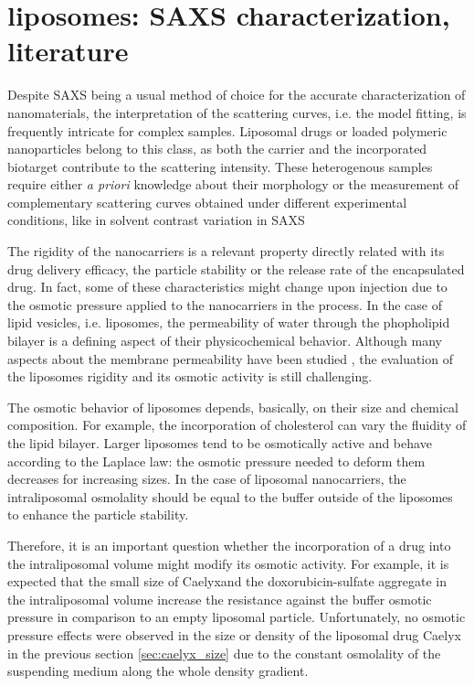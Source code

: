 \section{liposomes: SAXS characterization, literature}

Despite SAXS being a usual method of choice for the accurate characterization of nanomaterials, the interpretation of the scattering curves, i.e. the model fitting, is frequently intricate for complex samples. Liposomal drugs or loaded polymeric nanoparticles belong to this class, as both the carrier and the incorporated biotarget contribute to the scattering intensity. These heterogenous samples require either \emph{a priori} knowledge about their morphology or the measurement of complementary scattering curves obtained under different experimental conditions, like in solvent contrast variation in SAXS


The rigidity of the nanocarriers is a relevant property directly related with its drug delivery efficacy, the particle stability or the release rate of the encapsulated drug. In fact, some of these characteristics might change upon injection due to the osmotic pressure applied to the nanocarriers in the process. In the case of lipid vesicles, i.e. liposomes, the permeability of water through the phopholipid bilayer is a defining aspect of their physicochemical behavior. Although many aspects about the membrane permeability have been studied \citep{nagle_theory_2008, mathai_structural_2008, olbrich_water_2000}, the evaluation of the liposomes rigidity and its osmotic activity is still challenging.

The osmotic behavior of liposomes depends, basically, on their size and chemical composition. For example, the incorporation of cholesterol can vary the fluidity of the lipid bilayer. Larger liposomes tend to be osmotically active \citep{de_gier_osmotic_1993} and behave according to the Laplace law: the osmotic pressure needed to deform them decreases for increasing sizes. In the case of liposomal nanocarriers, the intraliposomal osmolality should be equal to the buffer outside of the liposomes to enhance the particle stability. 

Therefore, it is an important question whether the incorporation of a drug into the intraliposomal volume might modify its osmotic activity. For example, it is expected that the small size of Caelyx\textregistered and the doxorubicin-sulfate aggregate in the intraliposomal volume increase the resistance against the buffer osmotic pressure in comparison to an empty liposomal particle. Unfortunately, no osmotic pressure effects were observed in the size or density of the liposomal drug Caelyx \textregistered in the previous section \ref{sec:caelyx_size} due to the constant osmolality of the suspending medium along the whole density gradient.

